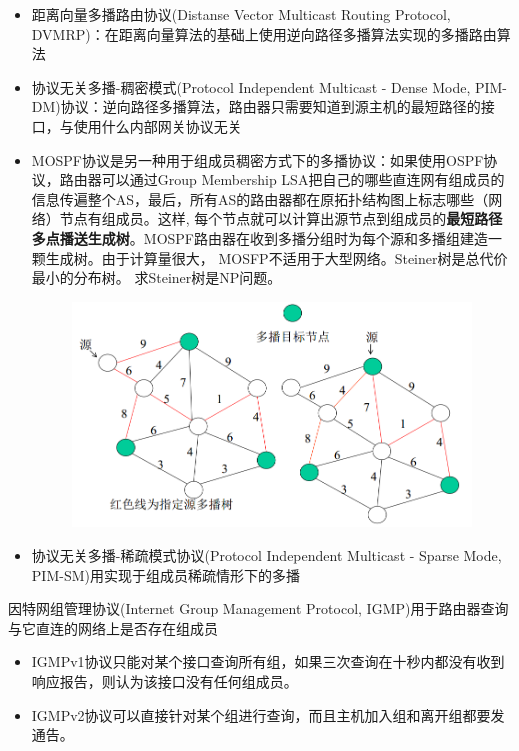 \begin{itemize}
	\item 距离向量多播路由协议(Distanse	Vector Multicast Routing Protocol, DVMRP)：在距离向量算法的基础上使用逆向路径多播算法实现的多播路由算法
	\item 协议无关多播-稠密模式(Protocol Independent Multicast - Dense Mode, PIM-DM)协议：逆向路径多播算法，路由器只需要知道到源主机的最短路径的接口，与使用什么内部网关协议无关
	\item MOSPF协议是另一种用于组成员稠密方式下的多播协议：如果使用OSPF协议，路由器可以通过Group Membership LSA把自己的哪些直连网有组成员的信息传遍整个AS，最后，所有AS的路由器都在原拓扑结构图上标志哪些（网络）节点有组成员。这样, 每个节点就可以计算出源节点到组成员的\textbf{最短路径多点播送生成树}。MOSPF路由器在收到多播分组时为每个源和多播组建造一颗生成树。由于计算量很大， MOSFP不适用于大型网络。Steiner树是总代价最小的分布树。 求Steiner树是NP问题。
	\begin{figure}[H]
		\centering
		\includegraphics[width=0.6\linewidth]{fig/MOSPF.png}
	\end{figure}
	\item 协议无关多播-稀疏模式协议(Protocol Independent Multicast - Sparse Mode, PIM-SM)用实现于组成员稀疏情形下的多播
\end{itemize}

因特网组管理协议(Internet Group Management Protocol, IGMP)用于路由器查询与它直连的网络上是否存在组成员
\begin{itemize}
	\item IGMPv1协议只能对某个接口查询所有组，如果三次查询在十秒内都没有收到响应报告，则认为该接口没有任何组成员。
	\item IGMPv2协议可以直接针对某个组进行查询，而且主机加入组和离开组都要发通告。
\end{itemize}